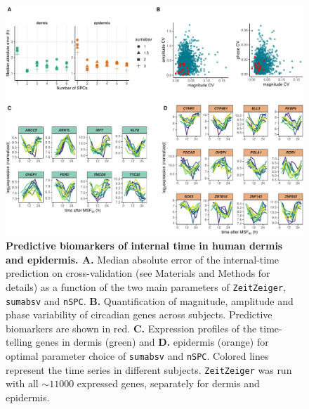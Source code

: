 \begin{figure}[h!tb]
	\begin{center}
		\includegraphics[width=\textwidth]{./Figures/suppfig5.pdf}
		\caption{\textbf{Predictive biomarkers of internal time in human dermis and epidermis. A. }Median absolute error of the internal-time prediction on cross-validation (see Materials and Methods for details) as a function of the two main parameters of \texttt{ZeitZeiger}, \texttt{sumabsv} and \texttt{nSPC}. \textbf{B.} Quantification of magnitude, amplitude and phase variability of circadian genes across subjects. Predictive biomarkers are shown in red. \textbf{C.} Expression profiles of the time-telling genes in dermis (green) and \textbf{D.} epidermis (orange) for optimal parameter choice of \texttt{sumabsv} and \texttt{nSPC}. Colored lines represent the time series in different subjects. \texttt{ZeitZeiger} was run with all $\sim11000$ expressed genes, separately for dermis and epidermis.}%
		\label{fig:suppfig5}
	\end{center}
\end{figure}
\clearpage

\clearpage


